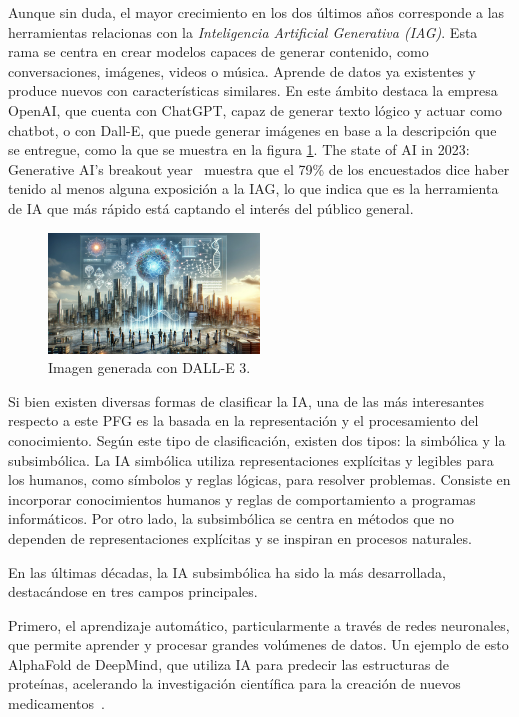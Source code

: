 Aunque sin duda, el mayor crecimiento en los dos últimos años corresponde a las herramientas relacionas con la \textit{Inteligencia Artificial Generativa (IAG)}. Esta rama se centra en crear modelos capaces de generar contenido, como conversaciones, imágenes, videos o música. Aprende de datos ya existentes y produce nuevos con características similares. En este ámbito destaca la empresa OpenAI, que cuenta con ChatGPT, capaz de generar texto lógico y actuar como chatbot, o con Dall-E, que puede generar imágenes en base a la descripción que se entregue, como la que se muestra en la figura \ref{fig:dall-e}. The state of AI in 2023: Generative AI's breakout year~\cite{mckinsey2023state} muestra que el 79\% de los encuestados dice haber tenido al menos alguna exposición a la IAG, lo que indica que es la herramienta de IA que más rápido está captando el interés del público general.

\begin{figure}[H]
    \centering
    \includegraphics[width=0.5\textwidth]{figures/dall-e.png}
    \caption{Imagen generada con DALL-E 3.}
    \label{fig:dall-e}
\end{figure}

Si bien existen diversas formas de clasificar la IA, una de las más interesantes respecto a este PFG es la basada en la representación y el procesamiento del conocimiento. Según este tipo de clasificación, existen dos tipos: la simbólica y la subsimbólica. La IA simbólica utiliza representaciones explícitas y legibles para los humanos, como símbolos y reglas lógicas, para resolver problemas. Consiste en incorporar conocimientos humanos y reglas de comportamiento a programas informáticos. Por otro lado, la subsimbólica se centra en métodos que no dependen de representaciones explícitas y se inspiran en procesos naturales.

En las últimas décadas, la IA subsimbólica ha sido la más desarrollada, destacándose en tres campos principales.

Primero, el aprendizaje automático, particularmente a través de redes neuronales, que permite aprender y procesar grandes volúmenes de datos. Un ejemplo de esto AlphaFold de DeepMind, que utiliza IA para predecir las estructuras de proteínas, acelerando la investigación científica para la creación de nuevos medicamentos~\cite{AlphaFold2024}.

